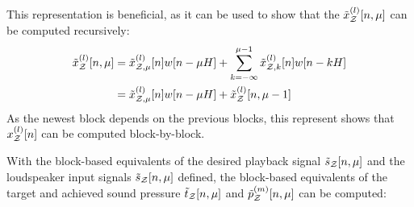 This representation is beneficial, as it can be used to show that the $\tilde{x}^{(l)}_{\mathcal{Z}}[n, \mu]$ can be computed recursively:
\begin{align}
    \tilde{x}^{(l)}_{\mathcal{Z}}[n, \mu] &= \tilde{x}^{(l)}_{\mathcal{Z},\mu}[n]w[n - \mu H] +
                               \sum_{k=-\infty}^{\mu - 1} \tilde{x}^{(l)}_{\mathcal{Z},k}[n]w[n - kH] \\
                           &=  \tilde{x}^{(l)}_{\mathcal{Z},\mu}[n]w[n - \mu H] + \tilde{x}^{(l)}_{\mathcal{Z}}[n, \mu - 1]
\end{align}
As the newest block depends on the previous blocks, this represent shows that $x^{(l)}_{\mathcal{Z}}[n]$ can be computed block-by-block.

With the block-based equivalents of the desired playback signal $\tilde{s}_{\mathcal{Z}}[n, \mu]$ and the loudspeaker input signals $\tilde{s}_{\mathcal{Z}}[n, \mu]$ defined,
the block-based equivalents of the target and achieved sound pressure $\tilde{t}_{\mathcal{Z}}[n, \mu]$ and $\tilde{p}^{(m)}_{\mathcal{Z}}[n, \mu]$ can be computed: 

